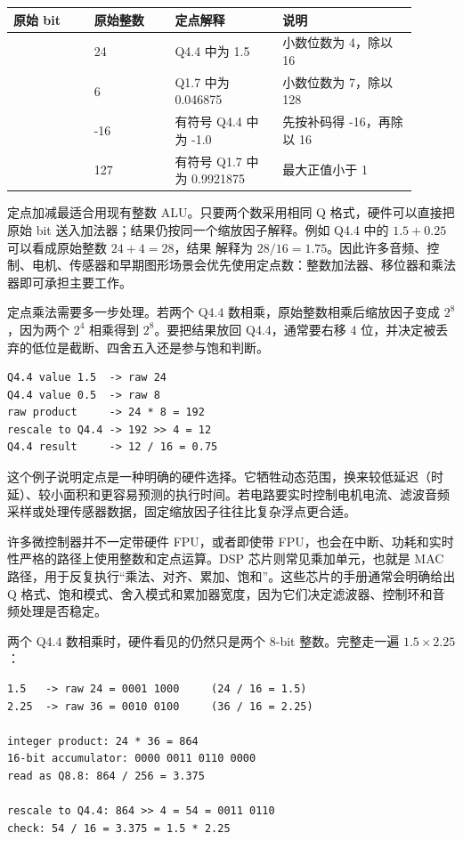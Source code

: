 \begin{longtable}{L{0.18\linewidth}L{0.18\linewidth}L{0.24\linewidth}L{0.3\linewidth}}
\toprule
原始 bit & 原始整数 & 定点解释 & 说明 \\
\midrule
{} & 24 & Q4.4 中为 1.5 & 小数位数为 4，除以 16 \\\tablerowrule
{} & 6 & Q1.7 中为 0.046875 & 小数位数为 7，除以 128 \\\tablerowrule
{} & -16 & 有符号 Q4.4 中为 -1.0 & 先按补码得 -16，再除以 16 \\\tablerowrule
{} & 127 & 有符号 Q1.7 中为 0.9921875 & 最大正值小于 1 \\
\bottomrule
\end{longtable}

定点加减最适合用现有整数 ALU。只要两个数采用相同 Q 格式，硬件可以直接把原始 bit 送入加法器；结果仍按同一个缩放因子解释。例如 Q4.4 中的 $1.5+0.25$ 可以看成原始整数 $24+4=28$，结果  解释为 $28/16=1.75$。因此许多音频、控制、电机、传感器和早期图形场景会优先使用定点数：整数加法器、移位器和乘法器即可承担主要工作。

定点乘法需要多一步处理。若两个 Q4.4 数相乘，原始整数相乘后缩放因子变成 $2^8$，因为两个 $2^4$ 相乘得到 $2^8$。要把结果放回 Q4.4，通常要右移 4 位，并决定被丢弃的低位是截断、四舍五入还是参与饱和判断。

\begin{lstlisting}
Q4.4 value 1.5  -> raw 24
Q4.4 value 0.5  -> raw 8
raw product     -> 24 * 8 = 192
rescale to Q4.4 -> 192 >> 4 = 12
Q4.4 result     -> 12 / 16 = 0.75
\end{lstlisting}

这个例子说明定点是一种明确的硬件选择。它牺牲动态范围，换来较低延迟（时延）、较小面积和更容易预测的执行时间。若电路要实时控制电机电流、滤波音频采样或处理传感器数据，固定缩放因子往往比复杂浮点更合适。

\begin{chipcase}
许多微控制器并不一定带硬件 FPU，或者即使带 FPU，也会在中断、功耗和实时性严格的路径上使用整数和定点运算。DSP 芯片则常见乘加单元，也就是 MAC 路径，用于反复执行“乘法、对齐、累加、饱和”。这些芯片的手册通常会明确给出 Q 格式、饱和模式、舍入模式和累加器宽度，因为它们决定滤波器、控制环和音频处理是否稳定。
\end{chipcase}

两个 Q4.4 数相乘时，硬件看见的仍然只是两个 8-bit 整数。完整走一遍 $1.5 \times 2.25$：

\begin{lstlisting}
1.5   -> raw 24 = 0001 1000     (24 / 16 = 1.5)
2.25  -> raw 36 = 0010 0100     (36 / 16 = 2.25)

integer product: 24 * 36 = 864
16-bit accumulator: 0000 0011 0110 0000
read as Q8.8: 864 / 256 = 3.375

rescale to Q4.4: 864 >> 4 = 54 = 0011 0110
check: 54 / 16 = 3.375 = 1.5 * 2.25
\end{lstlisting}

